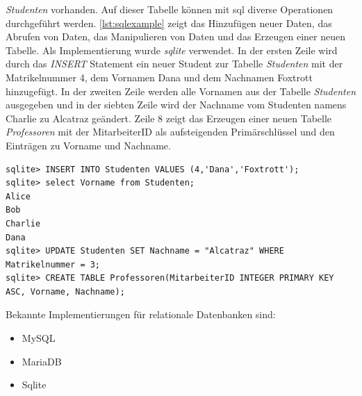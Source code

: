 \documentclass[titlepage]{report}
\begin{document}
\emph{Studenten} vorhanden. Auf dieser Tabelle können mit \gls{sql} diverse
Operationen durchgeführt werden. \autoref{lst:sqlexample} zeigt das Hinzufügen neuer
Daten, das Abrufen von Daten, das Manipulieren von Daten und das
Erzeugen einer neuen Tabelle. Als Implementierung wurde \emph{sqlite}
verwendet. In der ersten Zeile wird durch das \emph{INSERT} Statement
ein neuer Student zur Tabelle \emph{Studenten} mit der Matrikelnummer 4,
dem Vornamen Dana und dem Nachnamen Foxtrott hinzugefügt. In der zweiten
Zeile werden alle Vornamen aus der Tabelle \emph{Studenten}
ausgegeben und in der siebten Zeile wird der Nachname vom Studenten
namens Charlie zu Alcatraz geändert. Zeile 8 zeigt das Erzeugen einer
neuen Tabelle \emph{Professoren} mit der MitarbeiterID als
aufsteigenden Primärschlüssel und den Einträgen zu Vorname und Nachname.

\begin{minipage}{\linewidth}
\begin{lstlisting}[caption={Verwendung von Structured Query Language},label={lst:sqlexample}]
sqlite> INSERT INTO Studenten VALUES (4,'Dana','Foxtrott');
sqlite> select Vorname from Studenten;
Alice
Bob
Charlie
Dana
sqlite> UPDATE Studenten SET Nachname = "Alcatraz" WHERE Matrikelnummer = 3;
sqlite> CREATE TABLE Professoren(MitarbeiterID INTEGER PRIMARY KEY ASC, Vorname, Nachname);
\end{lstlisting}
\end{minipage}
Bekannte Implementierungen für relationale Datenbanken sind:
\begin{itemize}
    \item MySQL
    \item MariaDB
    \item Sqlite
\end{itemize}
\end{document}
